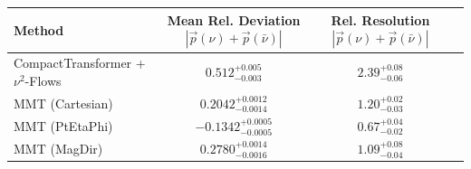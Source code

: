     \begin{tabular}{lccc}
        \toprule
        Method & Mean Rel. Deviation $|\vec{p}(\nu) + \vec{p}(\bar{\nu})|$ & Rel. Resolution $|\vec{p}(\nu) + \vec{p}(\bar{\nu})|$ \\
        \midrule
        CompactTransformer + $\nu^2$-Flows & $0.512^{+0.005}_{-0.003}$ & $2.39^{+0.08}_{-0.06}$ \\
        MMT (Cartesian) & $0.2042^{+0.0012}_{-0.0014}$ & $1.20^{+0.02}_{-0.03}$ \\
        MMT (PtEtaPhi) & $-0.1342^{+0.0005}_{-0.0005}$ & $0.67^{+0.04}_{-0.02}$ \\
        MMT (MagDir) & $0.2780^{+0.0014}_{-0.0016}$ & $1.09^{+0.08}_{-0.04}$ \\
        \bottomrule
    \end{tabular}